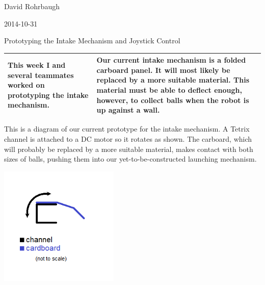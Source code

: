 David Rohrbaugh

2014-10-31

Prototyping the Intake Mechanism and Joystick Control

\begin{tabular}{|p{5cm}|p{5cm}|}
 \hline
 This week I and several teammates worked on prototyping the intake mechanism.
 &
 Our current intake mechanism is a folded carboard panel. It will most likely be replaced by a more suitable material. This material must be able to deflect enough, however, to collect balls when the robot is up against a wall.
 \\
 \hline
\end{tabular}

\medskip

This is a diagram of our current prototype for the intake mechanism. A Tetrix channel is attached to a DC motor so it rotates as shown. The carboard, which will probably be replaced by a more suitable material, makes contact with both sizes of balls, pushing them into our yet-to-be-constructed launching mechanism.

\begin{center}
 \includegraphics[width=215px]{./Entries/Images/intakePrototype.png}
\end{center}
